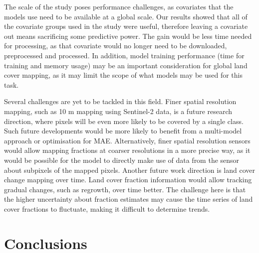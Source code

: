 \documentclass[review,authoryear,3p]{elsarticle}
\begin{document}
The scale of the study poses performance challenges, as covariates that the models use need to be available at a global scale.
Our results showed that all of the covariate groups used in the study were useful, therefore leaving a covariate out means sacrificing some predictive power.
The gain would be less time needed for processing, as that covariate would no longer need to be downloaded, preprocessed and processed.
In addition, model training performance (time for training and memory usage) may be an important consideration for global land cover mapping, as it may limit the scope of what models may be used for this task.

Several challenges are yet to be tackled in this field.
Finer spatial resolution mapping, such as 10 m mapping using Sentinel-2 data, is a future research direction, where pixels will be even more likely to be covered by a single class.
Such future developments would be more likely to benefit from a multi-model approach or optimisation for \gls{MAE}.
Alternatively, finer spatial resolution sensors would allow mapping fractions at coarser resolutions in a more precise way, as it would be possible for the model to directly make use of data from the sensor about subpixels of the mapped pixels.
Another future work direction is land cover change mapping over time.
Land cover fraction information would allow tracking gradual changes, such as regrowth, over time better.
The challenge here is that the higher uncertainty about fraction estimates may cause the time series of land cover fractions to fluctuate, making it difficult to determine trends.

\section{Conclusions}

\end{document}
